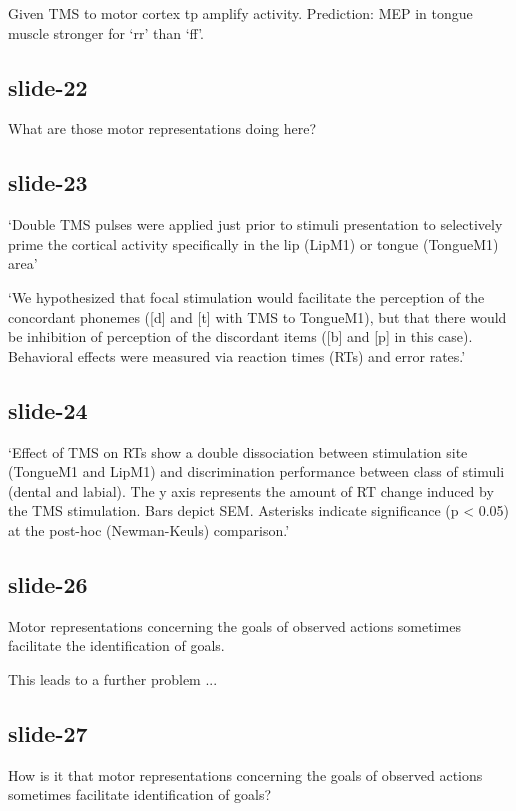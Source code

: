 \documentclass[12pt,\papersize]{extarticle}
\begin{document}
Given TMS to motor cortex tp amplify activity.
Prediction: MEP in tongue muscle stronger for ‘rr’ than ‘ff’.

\subsection{slide-22}
What are those motor representations doing here?

\subsection{slide-23}
‘Double TMS pulses were applied just prior to stimuli presentation to selectively prime the cortical activity specifically in the lip (LipM1) or tongue (TongueM1) area’
\citep[p.~381]{dausilio:2009_motor}

‘We hypothesized that focal stimulation would facilitate the perception of
the concordant phonemes ([d] and [t] with TMS to TongueM1), but that
there would be inhibition of perception of the discordant items
([b] and [p] in this case). Behavioral effects were measured via reaction
times (RTs) and error rates.’ \citep[p.~382]{dausilio:2009_motor}

\subsection{slide-24}
‘Effect of TMS on RTs show a double dissociation between stimulation
site (TongueM1 and LipM1) and discrimination performance between class
of stimuli (dental and labial). The y axis represents the amount of RT
change induced by the TMS stimulation. Bars depict SEM. Asterisks
indicate significance (p < 0.05) at the post-hoc (Newman-Keuls) comparison.’
\citep{dausilio:2009_motor}

\subsection{slide-26}
Motor representations concerning the goals of observed actions sometimes facilitate the identification of goals.

This leads to a further problem ...

\subsection{slide-27}
How is it that motor representations concerning the goals of observed actions sometimes
facilitate identification of goals?
\end{document}
